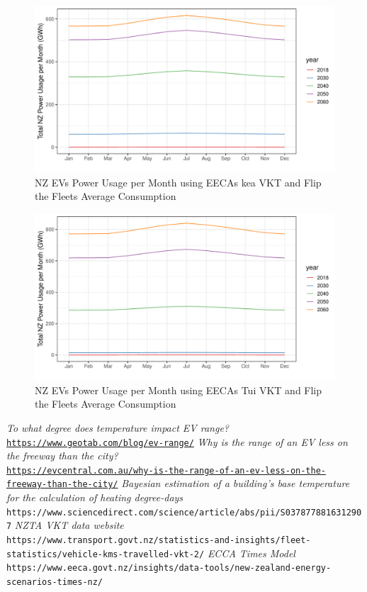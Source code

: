\documentclass[
]{article}
\begin{document}
\begin{figure}
\centering
\includegraphics{summary_week4_files/figure-latex/kea_power_usage-1.pdf}
\caption{NZ EVs Power Usage per Month using EECAs kea VKT and Flip the
Fleets Average Consumption}
\end{figure}

\begin{figure}
\centering
\includegraphics{summary_week4_files/figure-latex/tui_power_usage-1.pdf}
\caption{NZ EVs Power Usage per Month using EECAs Tui VKT and Flip the
Fleets Average Consumption}
\end{figure}

\begin{thebibliography}{9}
\textit{To what degree does temperature impact EV range?}
\\\texttt{\url{https://www.geotab.com/blog/ev-range/}}
\textit{Why is the range of an EV less on the freeway than the city?}
\\\texttt{\url{https://evcentral.com.au/why-is-the-range-of-an-ev-less-on-the-freeway-than-the-city/}}
\textit{Bayesian estimation of a building's base temperature for the calculation of heating degree-days}
\\\texttt{https://www.sciencedirect.com/science/article/abs/pii/S0378778816312907}
\textit{NZTA VKT data website}
\\\texttt{https://www.transport.govt.nz/statistics-and-insights/fleet-statistics/vehicle-kms-travelled-vkt-2/}
\textit{ECCA Times Model}
\\\texttt{https://www.eeca.govt.nz/insights/data-tools/new-zealand-energy-scenarios-times-nz/}
\end{thebibliography}
\end{document}
